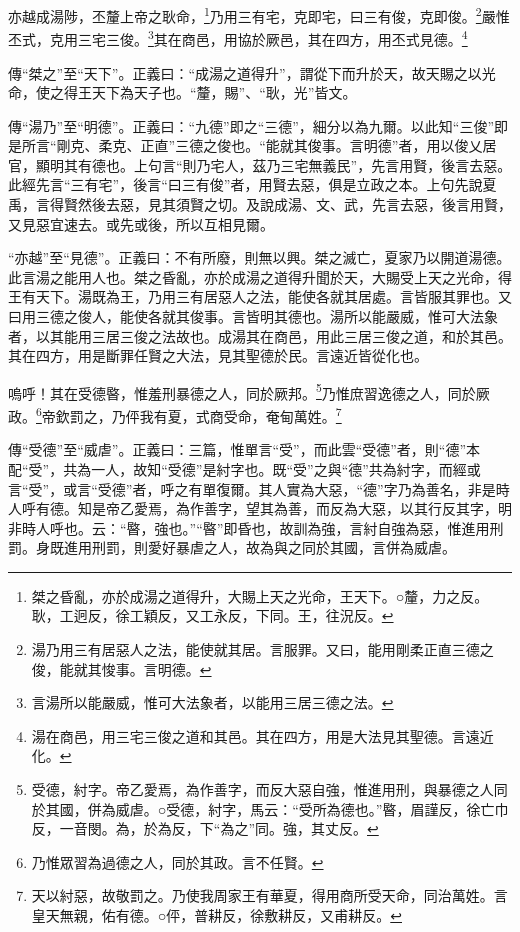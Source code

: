 亦越成湯陟，丕釐上帝之耿命，\footnote{桀之昏亂，亦於成湯之道得升，大賜上天之光命，王天下。○釐，力之反。耿，工迥反，徐工穎反，又工永反，下同。王，往況反。}乃用三有宅，克即宅，曰三有俊，克即俊。\footnote{湯乃用三有居惡人之法，能使就其居。言服罪。又曰，能用剛柔正直三德之俊，能就其悛事。言明德。}嚴惟丕式，克用三宅三俊。\footnote{言湯所以能嚴威，惟可大法象者，以能用三居三德之法。}其在商邑，用協於厥邑，其在四方，用丕式見德。\footnote{湯在商邑，用三宅三俊之道和其邑。其在四方，用是大法見其聖德。言遠近化。}


{\noindent\zhuan{}\fzbyks 傳“桀之”至“天下”。正義曰：“成湯之道得升”，謂從下而升於天，故天賜之以光命，使之得王天下為天子也。“釐，賜”、“耿，光”皆文。 \par}

{\noindent\zhuan{}\fzbyks 傳“湯乃”至“明德”。正義曰：“九德”即之“三德”，細分以為九爾。以此知“三俊”即是所言“剛克、柔克、正直”三德之俊也。“能就其俊事。言明德”者，用以俊乂居官，顯明其有德也。上句言“則乃宅人，茲乃三宅無義民”，先言用賢，後言去惡。此經先言“三有宅”，後言“曰三有俊”者，用賢去惡，俱是立政之本。上句先說夏禹，言得賢然後去惡，見其須賢之切。及說成湯、文、武，先言去惡，後言用賢，又見惡宜速去。或先或後，所以互相見爾。 \par}

{\noindent\shu{}\fzkt “亦越”至“見德”。正義曰：不有所廢，則無以興。桀之滅亡，夏家乃以開道湯德。此言湯之能用人也。桀之昏亂，亦於成湯之道得升聞於天，大賜受上天之光命，得王有天下。湯既為王，乃用三有居惡人之法，能使各就其居處。言皆服其罪也。又曰用三德之俊人，能使各就其俊事。言皆明其德也。湯所以能嚴威，惟可大法象者，以其能用三居三俊之法故也。成湯其在商邑，用此三居三俊之道，和於其邑。其在四方，用是斷罪任賢之大法，見其聖德於民。言遠近皆從化也。 \par}

嗚呼！其在受德暋，惟羞刑暴德之人，同於厥邦。\footnote{受德，紂字。帝乙愛焉，為作善字，而反大惡自強，惟進用刑，與暴德之人同於其國，併為威虐。○受德，紂字，馬云：“受所為德也。”暋，眉謹反，徐亡巾反，一音閔。為，於為反，下“為之”同。強，其丈反。}乃惟庶習逸德之人，同於厥政。\footnote{乃惟眾習為過德之人，同於其政。言不任賢。}帝欽罰之，乃伻我有夏，式商受命，奄甸萬姓。\footnote{天以紂惡，故敬罰之。乃使我周家王有華夏，得用商所受天命，同治萬姓。言皇天無親，佑有德。○伻，普耕反，徐敷耕反，又甫耕反。}


{\noindent\zhuan{}\fzbyks 傳“受德”至“威虐”。正義曰：三篇，惟單言“受”，而此雲“受德”者，則“德”本配“受”，共為一人，故知“受德”是紂字也。既“受”之與“德”共為紂字，而經或言“受”，或言“受德”者，呼之有單復爾。其人實為大惡，“德”字乃為善名，非是時人呼有德。知是帝乙愛焉，為作善字，望其為善，而反為大惡，以其行反其字，明非時人呼也。云：“暋，強也。”“暋”即昏也，故訓為強，言紂自強為惡，惟進用刑罰。身既進用刑罰，則愛好暴虐之人，故為與之同於其國，言併為威虐。 \par}

